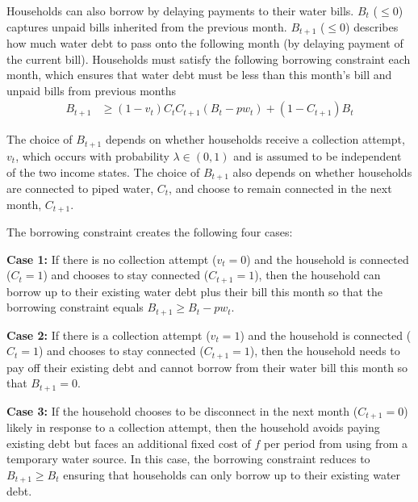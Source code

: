 \documentclass[12pt]{article}
\begin{document}
Households can also borrow by delaying payments to their water bills.  $B_t$ ($\leq0$) captures unpaid bills inherited from the previous month.  $B_{t+1}$ ($\leq0$) describes how much water debt to pass onto the following month (by delaying payment of the current bill).  Households must satisfy the following borrowing constraint each month, which ensures that water debt must be less than this month's bill and unpaid bills from previous months
\begin{align}\label{eq:borrowingconstraint}
B_{t+1} &\geq (1-v_t)  C_{t} C_{t+1} (B_t -pw_t) + (1-C_{t+1})B_t 
\end{align}




The choice of $B_{t+1}$ depends on whether households receive a collection attempt, $v_t$, which occurs with probability $\lambda \in (0,1)$ and is assumed to be independent of the two income states.  The choice of $B_{t+1}$ also depends on whether households are connected to piped water, $C_t$, and choose to remain connected in the next month, $C_{t+1}$.  


The borrowing constraint creates the following four cases:

\textbf{Case 1:} If there is no collection attempt ($v_t=0$) and the household is connected ($C_{t}=1$) and chooses to stay connected ($C_{t+1}=1$), then the household can borrow up to their existing water debt plus their bill this month so that the borrowing constraint equals $B_{t+1}\geq B_t -  p w_t $.

\textbf{Case 2:} If there is a collection attempt ($v_t=1$) and the household is connected ($C_t=1$) and chooses to stay connected ($C_{t+1}=1$), then the household needs to pay off their existing debt and cannot borrow from their water bill this month so that $B_{t+1} = 0$.

\textbf{Case 3:} If the household chooses to be disconnect in the next month ($C_{t+1}=0$) likely in response to a collection attempt, then the household avoids paying existing debt but faces an additional fixed cost of $f$ per period from using from a temporary water source.  In this case, the borrowing constraint reduces to $ B_{t+1} \geq B_t$ ensuring that households can only borrow up to their existing water debt.  
\end{document}
